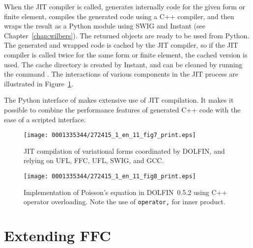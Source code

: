 When the JIT compiler is called, \ffc{} generates internally \ufc{}
code for the given form or finite element, compiles the generated code
using a C++ compiler, and then wraps the result as a Python module using
SWIG and Instant (see Chapter~\ref{chap:wilbers}).  The returned objects
are ready to be used from Python.  The generated and wrapped code is
cached by the JIT compiler, so if the JIT compiler is called twice
for the same form or finite element, the cached version is used. The
cache directory is created by Instant, and can be cleaned by running the
command .  The interactions of various components in
the JIT process are illustrated in Figure~\ref{fig:logg-1:jit}.

The Python interface of \dolfin{} makes extensive use of JIT
compilation. It makes it possible to combine the performance features
of generated C++ code with the ease of a scripted interface.

\begin{figure}[!t]
\bwfig
\centering
\texttt{[image: 0001335344/272415\_1\_en\_11\_fig7\_print.eps]}
\caption{JIT compilation of variational forms coordinated by
DOLFIN, and relying on UFL, FFC, UFL, SWIG, and GCC.}
\label{fig:logg-1:jit}\vspace*{3pt}
\end{figure}

\begin{figure}[!t]
\bwfig
\texttt{[image: 0001335344/272415\_1\_en\_11\_fig8\_print.eps]}
  \caption{Implementation of Poisson's equation in DOLFIN~0.5.2 using C++ operator overloading.
           Note the use of \texttt{operator,} for inner product.}
  \label{fig:logg-1:poisson,before}\vspace*{-7pt}
\end{figure}

\section{Extending FFC}

